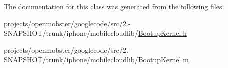\-The documentation for this class was generated from the following files\-:\begin{DoxyCompactItemize}
\item 
projects/openmobster/googlecode/src/2.-\/\-S\-N\-A\-P\-S\-H\-O\-T/trunk/iphone/mobilecloudlib/\hyperlink{_bootup_kernel_8h}{\-Bootup\-Kernel.\-h}\item 
projects/openmobster/googlecode/src/2.-\/\-S\-N\-A\-P\-S\-H\-O\-T/trunk/iphone/mobilecloudlib/\hyperlink{_bootup_kernel_8m}{\-Bootup\-Kernel.\-m}\end{DoxyCompactItemize}
